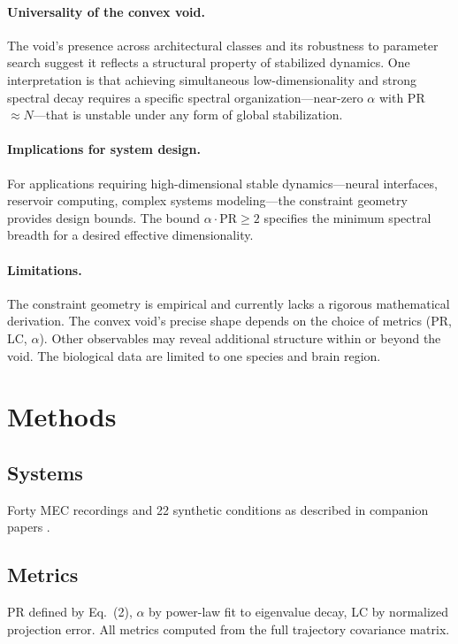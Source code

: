 \documentclass{chaos-article}
\begin{document}
\paragraph{Universality of the convex void.}
The void's presence across architectural classes and its robustness to parameter search suggest it reflects a structural property of stabilized dynamics. One interpretation is that achieving simultaneous low-dimensionality and strong spectral decay requires a specific spectral organization---near-zero $\alpha$ with PR $\approx N$---that is unstable under any form of global stabilization.

\paragraph{Implications for system design.}
For applications requiring high-dimensional stable dynamics---neural interfaces, reservoir computing, complex systems modeling---the constraint geometry provides design bounds. The bound $\alpha \cdot \text{PR} \ge 2$ specifies the minimum spectral breadth for a desired effective dimensionality.

\paragraph{Limitations.}
The constraint geometry is empirical and currently lacks a rigorous mathematical derivation. The convex void's precise shape depends on the choice of metrics (PR, LC, $\alpha$). Other observables may reveal additional structure within or beyond the void. The biological data are limited to one species and brain region.

\section{Methods}

\subsection{Systems}

Forty MEC recordings and 22 synthetic conditions as described in companion papers \cite{collapse_law, spectral_sustainment}.

\subsection{Metrics}

PR defined by Eq.~(2), $\alpha$ by power-law fit to eigenvalue decay, LC by normalized projection error. All metrics computed from the full trajectory covariance matrix.
\end{document}
